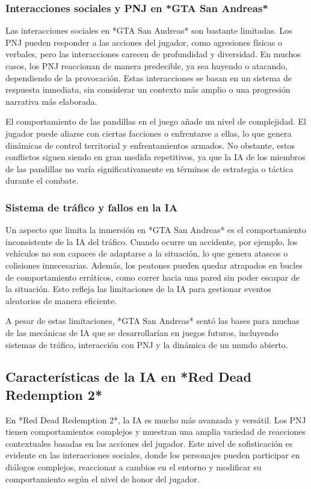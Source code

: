\documentclass[10pt]{article}
\begin{document}
\subsubsection{Interacciones sociales y PNJ en *GTA San Andreas*}
Las interacciones sociales en *GTA San Andreas* son bastante limitadas. Los PNJ pueden responder a las acciones del jugador, como agresiones físicas o verbales, pero las interacciones carecen de profundidad y diversidad. En muchos casos, los PNJ reaccionan de manera predecible, ya sea huyendo o atacando, dependiendo de la provocación. Estas interacciones se basan en un sistema de respuesta inmediata, sin considerar un contexto más amplio o una progresión narrativa más elaborada.

El comportamiento de las pandillas en el juego añade un nivel de complejidad. El jugador puede aliarse con ciertas facciones o enfrentarse a ellas, lo que genera dinámicas de control territorial y enfrentamientos armados. No obstante, estos conflictos siguen siendo en gran medida repetitivos, ya que la IA de los miembros de las pandillas no varía significativamente en términos de estrategia o táctica durante el combate.

\subsubsection{Sistema de tráfico y fallos en la IA}
Un aspecto que limita la inmersión en *GTA San Andreas* es el comportamiento inconsistente de la IA del tráfico. Cuando ocurre un accidente, por ejemplo, los vehículos no son capaces de adaptarse a la situación, lo que genera atascos o colisiones innecesarias. Además, los peatones pueden quedar atrapados en bucles de comportamiento erráticos, como correr hacia una pared sin poder escapar de la situación. Esto refleja las limitaciones de la IA para gestionar eventos aleatorios de manera eficiente.

A pesar de estas limitaciones, *GTA San Andreas* sentó las bases para muchas de las mecánicas de IA que se desarrollarían en juegos futuros, incluyendo sistemas de tráfico, interacción con PNJ y la dinámica de un mundo abierto.

\subsection{Características de la IA en *Red Dead Redemption 2*}
En *Red Dead Redemption 2*, la IA es mucho más avanzada y versátil. Los PNJ tienen comportamientos complejos y muestran una amplia variedad de reacciones contextuales basadas en las acciones del jugador. Este nivel de sofisticación es evidente en las interacciones sociales, donde los personajes pueden participar en diálogos complejos, reaccionar a cambios en el entorno y modificar su comportamiento según el nivel de honor del jugador.
\end{document}
